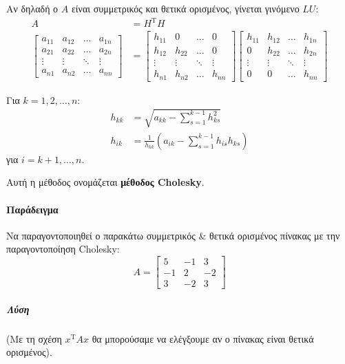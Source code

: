 \documentclass[11pt,a4paper,notitlepage,fleqn,final]{article}
\begin{document}
Αν δηλαδή ο \( A \) είναι συμμετρικός και θετικά ορισμένος,
γίνεται γινόμενο \( LU \):
\begin{align*}
	A &= H^{\mathrm T}H \\
	\left[\begin{matrix}
	a_{11}&a_{12}&\hdots&a_{1n} \\
	a_{21}&a_{22}&\hdots&a_{2n}\\
	\vdots&\vdots&\ddots&\vdots\\
	a_{n1}&a_{n2}&\hdots&a_{nn}
	\end{matrix}\right] &= \left[\begin{matrix}
	h_{11}&0&\hdots&0\\
	h_{12}&h_{22}&\hdots&0\\
	\vdots&\vdots&\ddots&\vdots\\
	h_{n1}&h_{n2}&\hdots&h_{nn}
	\end{matrix}\right]\left[\begin{matrix}
	h_{11}&h_{12}&\hdots&h_{1n}\\
	0&h_{22}&\hdots&h_{2n}\\
	\vdots & \vdots & \ddots & \vdots \\
	0 & 0 & \hdots & h_{nn}
	\end{matrix}\right]
\end{align*}

Για \( k=1,2,\dots,n \):
\begin{align*}
	h_{kk} &= \sqrt{a_{kk}-\sum_{s=1}^{k-1} h_{ks}^2 }\\
	h_{ik} &= \frac{1}{h_{kk}}\left(a_{ik}-\sum_{s=1}^{k-1}
h_{is}h_{ks}\right)
\end{align*}
για \( i=k+1,\dots,n \).

Αυτή η μέθοδος ονομάζεται \textbf{μέθοδος Cholesky}.

\paragraph{Παράδειγμα}
Να παραγοντοποιηθεί ο παρακάτω συμμετρικός \& θετικά ορισμένος
πίνακας με την παραγοντοποίηση Cholesky:
\[
A = \left[\begin{matrix}
5&-1&3\\-1&2&-2\\3&-2&3
\end{matrix}\right]
\]
\subparagraph{Λύση}
(Με τη σχέση \( x^{\mathrm T}Ax \) θα μπορούσαμε να ελέγξουμε αν
ο πίνακας είναι θετικά ορισμένος).
\end{document}
